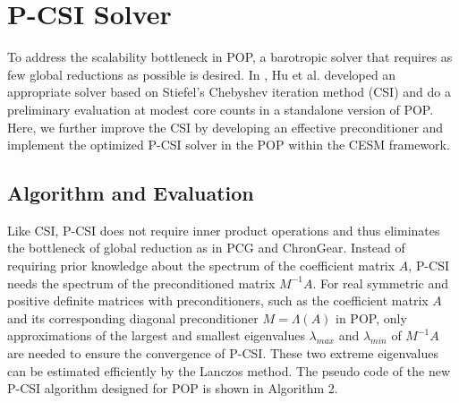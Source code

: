 \section{P-CSI Solver} \label{se:psi}
To address the scalability bottleneck in POP, a barotropic solver that
requires as few global reductions as possible is desired.
In \cite{hu2013scalable},  Hu et al. developed an appropriate solver based
on Stiefel's Chebyshev iteration method (CSI) and do a preliminary
evaluation at modest core counts in a standalone version of POP.
Here, we further improve the CSI by developing an effective preconditioner and implement the optimized P-CSI solver in the POP within the CESM framework. 

\subsection{Algorithm and Evaluation} \label{se:psialg}
Like CSI, P-CSI does not require inner product operations and thus eliminates the bottleneck of global reduction as in PCG and ChronGear.
Instead of requiring prior knowledge about the spectrum of the coefficient matrix $A$, P-CSI needs the spectrum of the preconditioned matrix $M^{-1}A$.
For real symmetric and positive definite matrices with preconditioners,
such as the coefficient matrix $A$ and its corresponding diagonal preconditioner $M = \Lambda(A)$ in POP,
only approximations of the largest and smallest eigenvalues $\lambda_{max}$ and $\lambda_{min}$ of $M^{-1}A$ are needed to ensure the convergence of P-CSI. 
These two extreme eigenvalues can be estimated efficiently by the Lanczos method. 
The pseudo code of the new P-CSI algorithm designed for POP is shown in Algorithm 2.

